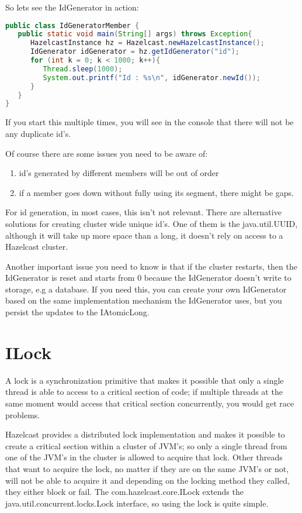 So lets see the IdGenerator in action:
\begin{lstlisting}[language=java]
public class IdGeneratorMember {
   public static void main(String[] args) throws Exception{
      HazelcastInstance hz = Hazelcast.newHazelcastInstance();
      IdGenerator idGenerator = hz.getIdGenerator("id");
      for (int k = 0; k < 1000; k++){
         Thread.sleep(1000);
         System.out.printf("Id : %s\n", idGenerator.newId());
      }
   }
}
\end{lstlisting}
If you start this multiple times, you will see in the console that there will not be any duplicate id's.

Of course there are some issues you need to be aware of:
\begin{enumerate}
\item id's generated by different members will be out of order
\item if a member goes down without fully using its segment, there might be gaps.
\end{enumerate}
For id generation, in most cases, this isn't not relevant. There are alternative solutions for creating cluster wide unique id's. One of them is the java.util.UUID, although it will take up more space than a long, it doesn't rely on access to a Hazelcast cluster.

Another important issue you need to know is that if the cluster restarts, then the IdGenerator is reset and starts from 0 because the IdGenerator doesn't write to storage, e.g a database. If you need this, you can create your own IdGenerator based on the same implementation mechanism the IdGenerator uses, but you persist the updates to the IAtomicLong.

\section{ILock}
A lock is a synchronization primitive that makes it possible that only a single thread is able to access to a critical section of code; if multiple threads at the same moment would access that critical section concurrently, you would get race problems. 

Hazelcast provides a distributed lock implementation and makes it possible to create a critical section within a cluster of JVM's; so only a single thread from one of the JVM's in the cluster is allowed to acquire that lock. Other threads that want to acquire the lock, no matter if they are on the same JVM's or not, will not be able to acquire it and depending on the locking method they called, they either block or fail. The com.hazelcast.core.ILock extends the java.util.concurrent.locks.Lock interface, so using the lock is quite simple.

